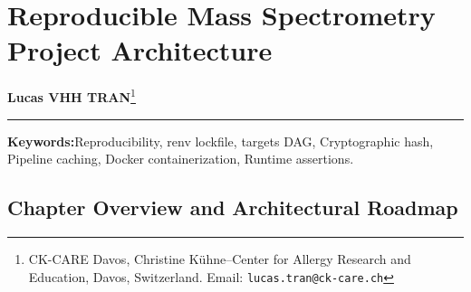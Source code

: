 \documentclass[11pt,twoside,openright]{book}
\begin{document}
\setcounter{chapter}{3}
\chapter{Reproducible Mass Spectrometry Project Architecture}
\label{chap:reproducible_project}

\noindent
\textbf{Lucas VHH TRAN}\footnote{CK-CARE Davos, Christine K\"uhne--Center for Allergy Research and Education, Davos, Switzerland. Email: \texttt{lucas.tran@ck-care.ch}}\\
\rule{\textwidth}{0.8pt}

\begin{abstract}
\noindent
Reproducibility in mass spectrometry requires deterministic tracking of software versions, operating system dependencies, parameter configurations, and intermediate file caches \cite{peng2011reproducible, baker2016reproducibility, sandve2013ten}. Interactive graphical user interfaces obscure parameter histories and prevent exact replication across laboratories. In contrast, scripted pipelines define analytical operations as explicit code. A production-grade computational MS project relies on four architectural layers: portable file referencing that prevents hardcoded operating-system path failures \cite{muller2020here, marwick2018packaging}, dependency freezing via package lockfiles (\texttt{renv.lock}) \cite{ushey2024renv}, full-stack POSIX containerization (Docker) \cite{boettiger2015docker, nust2020ten}, and directed acyclic graph (DAG) caching (\texttt{targets}) \cite{landau2021targets}. DAG caching tracks cryptographic content hashes of raw spectral inputs and parameter values, recalculating only targets invalidated by code or parameter mutations while skipping computationally expensive peak-picking steps. This chapter presents the architecture of portable project layouts, cryptographic checksum verification, lockfile dependency auditing, DAG caching dynamics, and runtime contract assertions \cite{wickham2011testthat} in R 4.6.1.
\end{abstract}

\vspace{1em}
\noindent\textbf{Keywords:}\enspace Reproducibility, renv lockfile, targets DAG, Cryptographic hash, Pipeline caching, Docker containerization, Runtime assertions.

\vspace{1em}
\section*{Chapter Overview and Architectural Roadmap}
\end{document}
